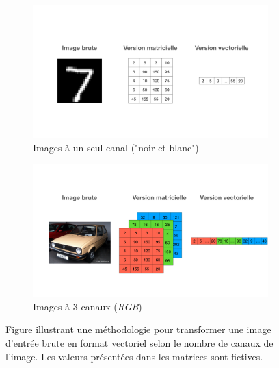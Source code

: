 \begin{figure}[h]
	\centering
	\begin{subfigure}{12cm}
		\centering
		\includegraphics[width=1\linewidth]{images/keynote/one-hot-transfo}
		\caption{Images à un seul canal ("noir et blanc")}
	\end{subfigure}
	\begin{subfigure}{12cm}
		\centering
		\includegraphics[width=1\linewidth]{images/keynote/one-hot-transfo-rgb}
		\caption{Images à 3 canaux (\textit{RGB})}
	\end{subfigure}
	\DIFdelbeginFL %
\DIFdelendFL \DIFaddbeginFL \caption[Exemple de vectorisation d'une image.]{\DIFaddendFL Figure illustrant une méthodologie pour transformer une image d'entrée brute en format vectoriel selon le nombre de canaux de l'image. Les valeurs présentées dans les matrices sont fictives.}
		\label{fig:one_hot}
\end{figure}


